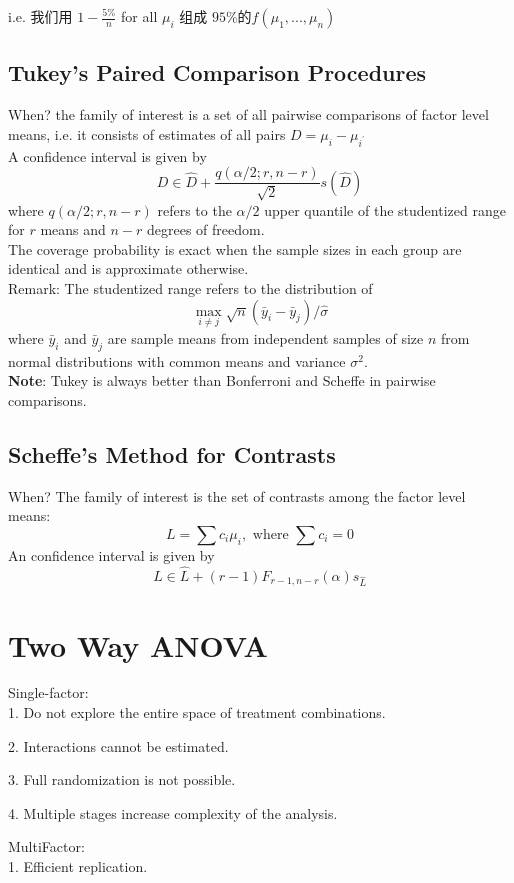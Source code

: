 \documentclass[11pt,a4paper]{article}
\begin{document}
i.e. 我们用 $1-\frac{5\%}{n}$ for all $\mu_i$ 组成 $95\%$的$f(\mu_1,...,\mu_n)$


\subsection{Tukey’s Paired Comparison Procedures}
When? the family of interest is a set of all pairwise comparisons of factor level means, i.e. it consists of estimates of all pairs $D=\mu_{i}-\mu_{i^{\prime}}$\\
A confidence interval is given by
$$
D \in \hat{D}+\frac{q(\alpha / 2 ; r, n-r)}{\sqrt{2}} s(\hat{D})
$$
where $q(\alpha / 2 ; r, n-r)$ refers to the $\alpha / 2$ upper quantile of the studentized range for $r$ means and $n-r$ degrees of freedom.\\
The coverage probability is exact when the sample sizes in each group are identical and is approximate otherwise.\\
Remark: The studentized range refers to the distribution of
$$
\max _{i \neq j} \sqrt{n}\left(\bar{y}_{i}-\bar{y}_{j}\right) / \hat{\sigma}
$$
where $\bar{y}_{i}$ and $\bar{y}_{j}$ are sample means from independent samples of size $n$ from normal distributions with common means and variance $\sigma^{2}$.\\
\textbf{Note}: Tukey is always better than Bonferroni and Scheffe in pairwise comparisons.

\subsection{Scheffe’s Method for Contrasts}
When? The family of interest is the set of contrasts among the factor level means:
$$
L=\sum c_{i} \mu_{i}, \text { where } \sum c_{i}=0
$$
An confidence interval is given by
$$
L \in \hat{L}+(r-1) F_{r-1, n-r}(\alpha) s_{\hat{L}}
$$


\section{Two Way ANOVA}
Single-factor:\\
1. Do not explore the entire space of treatment combinations.

2. Interactions cannot be estimated.

3. Full randomization is not possible.

4. Multiple stages increase complexity of the analysis.

MultiFactor:\\
1. Eﬃcient replication.
\end{document}
